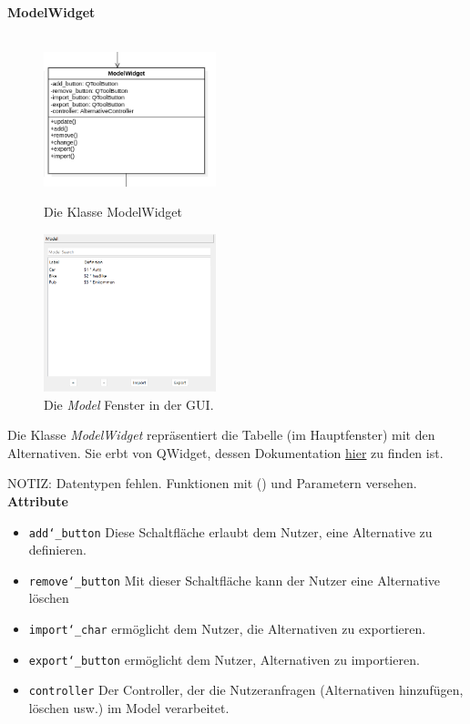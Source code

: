 \documentclass{article}
\begin{document}
\newpage
\textbf{\large{ModelWidget}}\\\\
\begin{figure}[H]%
    \centering
    \begin{minipage}[b]{0.4\textwidth}
        \includegraphics[width=5cm]{entwurf/Entwurf_dokument/img/Alissa/ModelWidget.png}
        \caption{Die Klasse ModelWidget}
    \end{minipage}
    \hfill
    \begin{minipage}[b]{0.4\textwidth}
        \includegraphics[width=5cm]{entwurf/Entwurf_dokument/img/Alissa/ModelGUI.png} 
    \caption{Die \textit{Model} Fenster in der GUI.}
    \end{minipage}
\end{figure}
Die Klasse \textit{ModelWidget} repräsentiert die Tabelle (im Hauptfenster) mit den Alternativen. Sie erbt von QWidget, dessen Dokumentation \href{https://doc.qt.io/qt-6/qwidget.html}{hier} zu finden ist. 
\newline \newline

NOTIZ: Datentypen fehlen. Funktionen mit () und Parametern versehen.
\textbf{{Attribute}}
\begin{itemize}
\item \texttt{add\char`_button} \newline Diese Schaltfläche erlaubt dem Nutzer, eine Alternative zu definieren.
\item \texttt{remove\char`_button} \newline Mit dieser Schaltfläche kann der Nutzer eine Alternative löschen
\item \texttt{import\char`_char} \newline ermöglicht dem Nutzer, die Alternativen zu exportieren.
\item \texttt{export\char`_button} \newline ermöglicht dem Nutzer, Alternativen zu importieren.
\item \texttt{controller} \newline Der Controller, der die Nutzeranfragen (Alternativen hinzufügen, löschen usw.) im Model verarbeitet.
\end{itemize}
\end{document}
